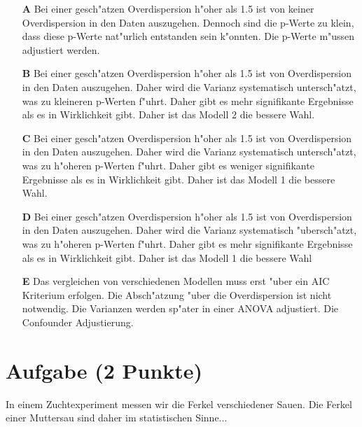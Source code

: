 \documentclass[a4paper, 10pt]{scrartcl}\usepackage[]{graphicx}\usepackage[]{xcolor}
\begin{document}
\begin{enumerate}
\item [\textbf{A} \msquare] Bei einer gesch{"a}tzen Overdispersion h{"o}her als 1.5 ist von keiner Overdispersion in den Daten auszugehen. Dennoch sind die p-Werte zu klein, dass diese p-Werte nat{"u}rlich entstanden sein k{"o}nnten. Die p-Werte m{"u}ssen adjustiert werden.
\item [\textbf{B} \msquare] Bei einer gesch{"a}tzen Overdispersion h{"o}her als 1.5 ist von Overdispersion in den Daten auszugehen. Daher wird die Varianz systematisch untersch{"a}tzt, was zu kleineren p-Werten f{"u}hrt. Daher gibt es mehr signifikante Ergebnisse als es in Wirklichkeit gibt. Daher ist das Modell 2 die bessere Wahl.
\item [\textbf{C} \msquare] Bei einer gesch{"a}tzen Overdispersion h{"o}her als 1.5 ist von Overdispersion in den Daten auszugehen. Daher wird die Varianz systematisch untersch{"a}tzt, was zu h{"o}heren p-Werten f{"u}hrt. Daher gibt es weniger signifikante Ergebnisse als es in Wirklichkeit gibt. Daher ist das Modell 1 die bessere Wahl.
\item [\textbf{D} \msquare] Bei einer gesch{"a}tzen Overdispersion h{"o}her als 1.5 ist von Overdispersion in den Daten auszugehen. Daher wird die Varianz systematisch {"u}bersch{"a}tzt, was zu h{"o}heren p-Werten f{"u}hrt. Daher gibt es mehr signifikante Ergebnisse als es in Wirklichkeit gibt. Daher ist das Modell 1 die bessere Wahl
\item [\textbf{E} \msquare] Das vergleichen von verschiedenen Modellen muss erst {"u}ber ein AIC Kriterium erfolgen. Die Absch{"a}tzung {"u}ber die Overdispersion ist nicht notwendig. Die Varianzen werden sp{"a}ter in einer ANOVA adjustiert. Die Confounder Adjustierung.
\end{enumerate}

\section{Aufgabe \hfill (2 Punkte)}

In einem Zuchtexperiment messen wir die Ferkel verschiedener Sauen. Die
Ferkel einer Muttersau sind daher im statistischen Sinne... 
\end{document}
